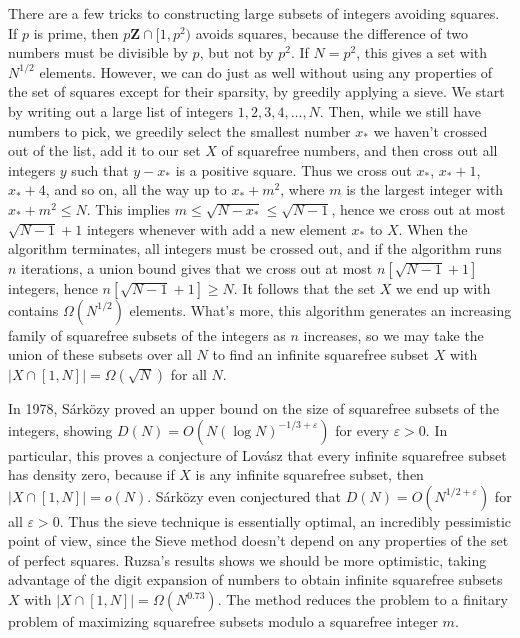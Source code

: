 There are a few tricks to constructing large subsets of integers avoiding squares. If $p$ is prime, then $p \mathbf{Z} \cap [1,p^2)$ avoids squares, because the difference of two numbers must be divisible by $p$, but not by $p^2$. If $N = p^2$, this gives a set with $N^{1/2}$ elements. However, we can do just as well without using any properties of the set of squares except for their sparsity, by greedily applying a sieve. We start by writing out a large list of integers $1,2,3,4,\dots,N$. Then, while we still have numbers to pick, we greedily select the smallest number $x_*$ we haven't crossed out of the list, add it to our set $X$ of squarefree numbers, and then cross out all integers $y$ such that $y - x_*$ is a positive square. Thus we cross out $x_*$, $x_* + 1$, $x_* + 4$, and so on, all the way up to $x_* + m^2$, where $m$ is the largest integer with $x_* + m^2 \leq N$. This implies $m \leq \sqrt{N - x_*} \leq \sqrt{N-1}$, hence we cross out at most $\sqrt{N-1} + 1$ integers whenever with add a new element $x_*$ to $X$. When the algorithm terminates, all integers must be crossed out, and if the algorithm runs $n$ iterations, a union bound gives that we cross out at most $n[\sqrt{N-1} + 1]$ integers, hence $n[\sqrt{N-1} + 1] \geq N$. It follows that the set $X$ we end up with contains $\Omega(N^{1/2})$ elements. What's more, this algorithm generates an increasing family of squarefree subsets of the integers as $n$ increases, so we may take the union of these subsets over all $N$ to find an infinite squarefree subset $X$ with $|X \cap [1,N]| = \Omega(\sqrt{N})$ for all $N$.

In 1978, S\'{a}rk\"{o}zy proved an upper bound on the size of squarefree subsets of the integers, showing $D(N) = O(N (\log N)^{-1/3 + \varepsilon})$ for every $\varepsilon > 0$. In particular, this proves a conjecture of Lov\'{a}sz that every infinite squarefree subset has density zero, because if $X$ is any infinite squarefree subset, then $|X \cap [1,N]| = o(N)$. S\'{a}rk\"{o}zy even conjectured that $D(N) = O(N^{1/2 + \varepsilon})$ for all $\varepsilon > 0$. Thus the sieve technique is essentially optimal, an incredibly pessimistic point of view, since the Sieve method doesn't depend on any properties of the set of perfect squares. Ruzsa's results shows we should be more optimistic, taking advantage of the digit expansion of numbers to obtain infinite squarefree subsets $X$ with $|X \cap [1,N]| = \Omega(N^{0.73})$. The method reduces the problem to a finitary problem of maximizing squarefree subsets modulo a squarefree integer $m$.


